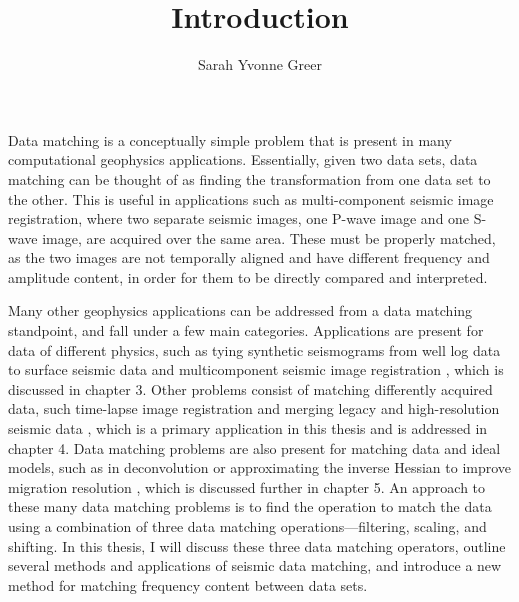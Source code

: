 \title{Introduction}
\author{Sarah Yvonne Greer}
\maketitle

Data matching is a conceptually simple problem that is present in many computational geophysics applications. 
Essentially, given two data sets, data matching can be thought of as finding the transformation from one data set to the other. 
This is useful in applications such as multi-component seismic image registration, where two separate seismic images, one P-wave image and one S- wave image, are acquired over the same area. 
These must be properly matched, as the two images are not temporally aligned and have different frequency and amplitude content, in order for them to be directly compared and interpreted. 

Many other geophysics applications can be addressed from a data matching standpoint, and fall under a few main categories.
Applications are present for data of different physics, such as tying synthetic seismograms from well log data to surface seismic data \cite[]{herrera, bader} and multicomponent seismic image registration \cite[]{multi,warp,hardage}, which is discussed in chapter 3.
Other problems consist of matching differently acquired data, such time-lapse image registration \cite[]{timelapse} and merging legacy and high-resolution seismic data \cite[]{merge}, which is a primary application in this thesis and is addressed in chapter 4.
Data matching problems are also present for matching data and ideal models, such as in deconvolution or approximating the inverse Hessian to improve migration resolution \cite[]{migdec,rtmmf,mighess}, which is discussed further in chapter 5.
An approach to these many data matching problems is to find the operation to match the data using a combination of three data matching operations---filtering, scaling, and shifting.
In this thesis, I will discuss these three data matching operators, outline several methods and applications of seismic data matching, and introduce a new method for matching frequency content between data sets.

